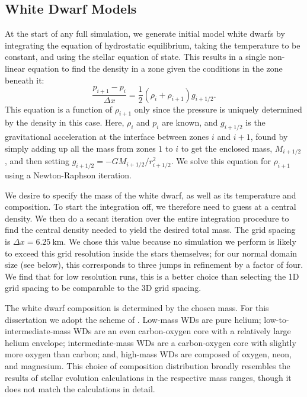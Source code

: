 \documentclass[12pt]{article}
\begin{document}
\subsection{White Dwarf Models}
\label{sec:initial_models}

At the start of any full simulation, we generate initial model white
dwarfs by integrating the equation of hydrostatic equilibrium, taking
the temperature to be constant, and using the
stellar equation of state.  This results in a single non-linear
equation to find the density in a zone given the conditions in the
zone beneath it:
\begin{equation}
\frac{p_{i+1} - p_i}{\Delta x} = \frac{1}{2} (\rho_i + \rho_{i+1}) g_{i+1/2}.
\end{equation}
This equation is a function of $\rho_{i+1}$ only since the pressure is
uniquely determined by the density in this case. Here, $\rho_i$ and $p_i$
are known, and $g_{i+1/2}$ is the gravitational acceleration at the
interface between zones $i$ and $i+1$, found by simply adding up all
the mass from zones $1$ to $i$ to get the enclosed mass,
$M_{i+1/2}$, and then setting $g_{i+1/2} =
-GM_{i+1/2}/r_{i+1/2}^2$. We solve this equation for $\rho_{i+1}$
using a Newton-Raphson iteration.

We desire to specify the mass of the white dwarf, as well as its
temperature and composition. To start the integration off, we
therefore need to guess at a central density.  We then do a secant
iteration over the entire integration procedure to find the central
density needed to yield the desired total mass.  The grid spacing is
$\Delta x = 6.25\ \text{km}$. We chose this value because no simulation
we perform is likely to exceed this grid resolution inside the stars
themselves; for our normal domain size (see below), this corresponds to
three jumps in refinement by a factor of four. We find that for low
resolution runs, this is a better choice than selecting the 1D grid
spacing to be comparable to the 3D grid spacing.

The white dwarf composition is determined by the chosen mass. For
this dissertation we adopt the scheme of \cite{dan:2012}. Low-mass WDs
are pure helium; low-to-intermediate-mass WDs are an even carbon-oxygen
core with a relatively large helium envelope; intermediate-mass
WDs are a carbon-oxygen core with slightly more oxygen than carbon;
and, high-mass WDs are composed of oxygen, neon, and magnesium.
This choice of composition distribution broadly resembles the
results of stellar evolution calculations in the respective
mass ranges, though it does not match the calculations in detail.
\end{document}
